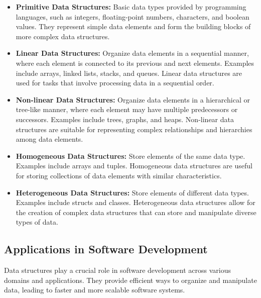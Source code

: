 \documentclass[12pt]{book} %
\begin{document}
\begin{itemize}
    \item \textbf{Primitive Data Structures:} Basic data types provided by programming languages, such as integers, floating-point numbers, characters, and boolean values. They represent simple data elements and form the building blocks of more complex data structures.
    
    \item \textbf{Linear Data Structures:} Organize data elements in a sequential manner, where each element is connected to its previous and next elements. Examples include arrays, linked lists, stacks, and queues. Linear data structures are used for tasks that involve processing data in a sequential order.
    
    \item \textbf{Non-linear Data Structures:} Organize data elements in a hierarchical or tree-like manner, where each element may have multiple predecessors or successors. Examples include trees, graphs, and heaps. Non-linear data structures are suitable for representing complex relationships and hierarchies among data elements.
    
    \item \textbf{Homogeneous Data Structures:} Store elements of the same data type. Examples include arrays and tuples. Homogeneous data structures are useful for storing collections of data elements with similar characteristics.
    
    \item \textbf{Heterogeneous Data Structures:} Store elements of different data types. Examples include structs and classes. Heterogeneous data structures allow for the creation of complex data structures that can store and manipulate diverse types of data.
\end{itemize}

\subsection{Applications in Software Development}

Data structures play a crucial role in software development across various domains and applications. They provide efficient ways to organize and manipulate data, leading to faster and more scalable software systems.
\end{document}
